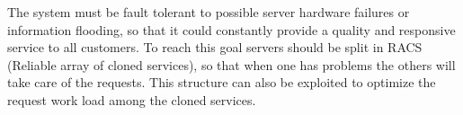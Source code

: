 The system must be fault tolerant to possible server hardware failures or information flooding, so that it could constantly provide a quality and responsive service to all customers. To reach this goal servers should be split in RACS (Reliable array of cloned services), so that when one has problems the others will take care of the requests. This structure can also be exploited to optimize the request work load among the cloned services.
